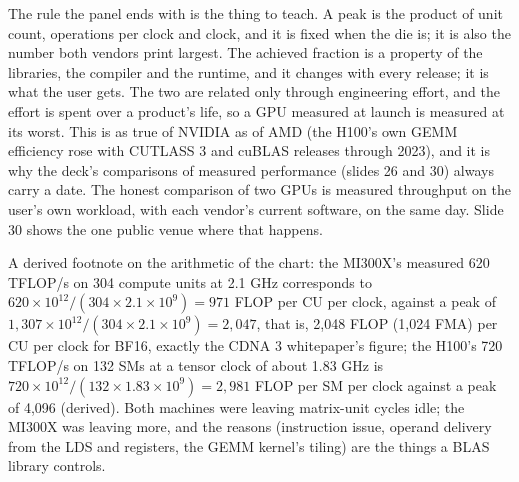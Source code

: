 \documentclass[11pt,letterpaper]{article}
\begin{document}
The rule the panel ends with is the thing to teach. A peak is the product of unit count, operations per clock and clock, and it is fixed when the die is; it is also the number both vendors print largest. The achieved fraction is a property of the libraries, the compiler and the runtime, and it changes with every release; it is what the user gets. The two are related only through engineering effort, and the effort is spent over a product's life, so a GPU measured at launch is measured at its worst. This is as true of NVIDIA as of AMD (the H100's own GEMM efficiency rose with CUTLASS 3 and cuBLAS releases through 2023), and it is why the deck's comparisons of measured performance (slides 26 and 30) always carry a date. The honest comparison of two GPUs is measured throughput on the user's own workload, with each vendor's current software, on the same day. Slide 30 shows the one public venue where that happens.

A derived footnote on the arithmetic of the chart: the MI300X's measured 620 TFLOP/s on 304 compute units at 2.1 GHz corresponds to $620\times10^{12} / (304 \times 2.1\times10^{9}) = 971$ FLOP per CU per clock, against a peak of $1{,}307\times10^{12} / (304 \times 2.1\times10^{9}) = 2{,}047$, that is, 2{,}048 FLOP (1{,}024 FMA) per CU per clock for BF16, exactly the CDNA 3 whitepaper's figure; the H100's 720 TFLOP/s on 132 SMs at a tensor clock of about 1.83 GHz is $720\times10^{12} / (132 \times 1.83\times10^{9}) = 2{,}981$ FLOP per SM per clock against a peak of 4{,}096 (derived). Both machines were leaving matrix-unit cycles idle; the MI300X was leaving more, and the reasons (instruction issue, operand delivery from the LDS and registers, the GEMM kernel's tiling) are the things a BLAS library controls.
\end{document}
